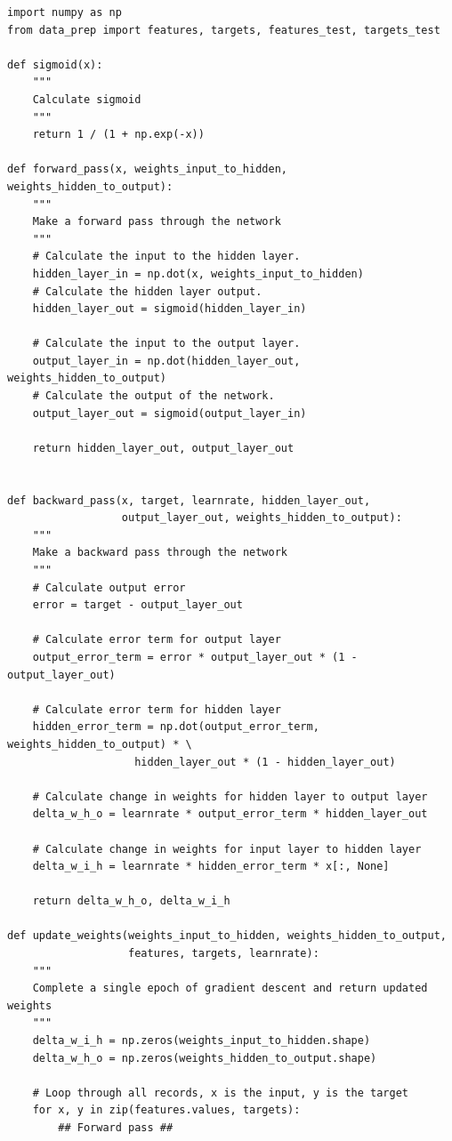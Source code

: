 \begin{lstlisting}
import numpy as np
from data_prep import features, targets, features_test, targets_test

def sigmoid(x):
    """
    Calculate sigmoid
    """
    return 1 / (1 + np.exp(-x))

def forward_pass(x, weights_input_to_hidden, weights_hidden_to_output):
    """
    Make a forward pass through the network
    """
    # Calculate the input to the hidden layer.
    hidden_layer_in = np.dot(x, weights_input_to_hidden)
    # Calculate the hidden layer output.
    hidden_layer_out = sigmoid(hidden_layer_in)

    # Calculate the input to the output layer.
    output_layer_in = np.dot(hidden_layer_out, weights_hidden_to_output)
    # Calculate the output of the network.
    output_layer_out = sigmoid(output_layer_in)

    return hidden_layer_out, output_layer_out


def backward_pass(x, target, learnrate, hidden_layer_out,
                  output_layer_out, weights_hidden_to_output):
    """
    Make a backward pass through the network
    """
    # Calculate output error
    error = target - output_layer_out

    # Calculate error term for output layer
    output_error_term = error * output_layer_out * (1 - output_layer_out)

    # Calculate error term for hidden layer
    hidden_error_term = np.dot(output_error_term, weights_hidden_to_output) * \
                    hidden_layer_out * (1 - hidden_layer_out)

    # Calculate change in weights for hidden layer to output layer
    delta_w_h_o = learnrate * output_error_term * hidden_layer_out

    # Calculate change in weights for input layer to hidden layer
    delta_w_i_h = learnrate * hidden_error_term * x[:, None]

    return delta_w_h_o, delta_w_i_h

def update_weights(weights_input_to_hidden, weights_hidden_to_output, 
                   features, targets, learnrate):
    """
    Complete a single epoch of gradient descent and return updated weights
    """
    delta_w_i_h = np.zeros(weights_input_to_hidden.shape)
    delta_w_h_o = np.zeros(weights_hidden_to_output.shape)
    
    # Loop through all records, x is the input, y is the target
    for x, y in zip(features.values, targets):
        ## Forward pass ##
        

\end{lstlisting}
